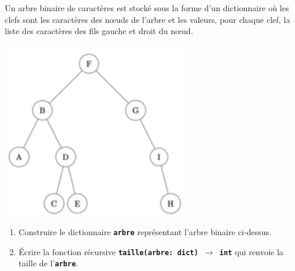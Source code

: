 \documentclass[a4paper,11pt]{article}
\begin{document}
\begin{exo}
    Un arbre binaire de caractères est stocké sous la forme d’un dictionnaire où les clefs sont les caractères des nœuds de l’arbre et les valeurs, pour
    chaque clef, la liste des caractères des fils gauche et droit du nœud.
    \begin{center}
        \centering
        \includegraphics[width=8cm]{ressources/arbre.png}
    \end{center}
    \begin{enumerate}
        \item Construire le dictionnaire \textbf{\texttt{arbre}} représentant l'arbre binaire ci-dessus.
        \item Écrire la fonction récursive \textbf{\texttt{taille(arbre: dict) $\rightarrow$ int}} qui renvoie la taille de l'\texttt{\textbf{arbre}}. 
    \end{enumerate}
\end{exo}
\end{document}
